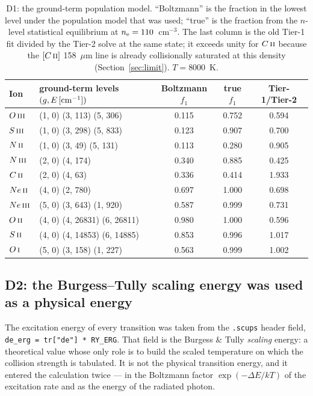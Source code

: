 \documentclass[english,a4paper]{my_memo}
\newcommand{\code}[1]{\texttt{#1}}
\newcommand{\OI}{O\,\textsc{i}}
\newcommand{\OII}{O\,\textsc{ii}}
\newcommand{\OIII}{O\,\textsc{iii}}
\newcommand{\NII}{N\,\textsc{ii}}
\newcommand{\NIII}{N\,\textsc{iii}}
\newcommand{\CII}{C\,\textsc{ii}}
\newcommand{\SII}{S\,\textsc{ii}}
\newcommand{\SIII}{S\,\textsc{iii}}
\newcommand{\NeII}{Ne\,\textsc{ii}}
\newcommand{\NeIII}{Ne\,\textsc{iii}}
\newcommand{\nel}{n_{\rm e}}
\begin{document}
\begin{table}[htbp]
\centering
\caption{D1: the ground-term population model.  ``Boltzmann'' is the fraction
in the lowest level under the population model that was used; ``true'' is the
fraction from the $n$-level statistical equilibrium at $\nel = 110$~cm$^{-3}$.
The last column is the old Tier-1 fit divided by the Tier-2 solve at the same
state; it exceeds unity for $\CII{}$ because the $[\CII{}]$ 158~$\mu$m line is
already collisionally saturated at this density (Section~\ref{sec:limit}).
$T = 8000$~K.}
\label{tab:pops}
\begin{tabular}{llccc}
\toprule
Ion & ground-term levels $(g, E\,[{\rm cm^{-1}}])$ & Boltzmann $f_1$ & true $f_1$ & Tier-1/Tier-2 \\
\midrule
$\OIII{}$  & (1, 0) (3, 113) (5, 306)      & 0.115 & 0.752 & 0.594 \\
$\SIII{}$  & (1, 0) (3, 298) (5, 833)      & 0.123 & 0.907 & 0.700 \\
$\NII{}$   & (1, 0) (3, 49) (5, 131)       & 0.113 & 0.280 & 0.905 \\
$\NIII{}$  & (2, 0) (4, 174)               & 0.340 & 0.885 & 0.425 \\
$\CII{}$   & (2, 0) (4, 63)                & 0.336 & 0.414 & 1.933 \\
$\NeII{}$  & (4, 0) (2, 780)               & 0.697 & 1.000 & 0.698 \\
$\NeIII{}$ & (5, 0) (3, 643) (1, 920)      & 0.587 & 0.999 & 0.731 \\
$\OII{}$   & (4, 0) (4, 26831) (6, 26811)  & 0.980 & 1.000 & 0.596 \\
$\SII{}$   & (4, 0) (4, 14853) (6, 14885)  & 0.853 & 0.996 & 1.017 \\
$\OI{}$    & (5, 0) (3, 158) (1, 227)      & 0.563 & 0.999 & 1.002 \\
\bottomrule
\end{tabular}
\end{table}

\subsection{D2: the Burgess--Tully scaling energy was used as a physical
energy}

The excitation energy of every transition was taken from the \code{.scups}
header field, \code{de\_erg = tr["de"] * RY\_ERG}.  That field is the
Burgess \& Tully \emph{scaling} energy: a theoretical value whose only role is
to build the scaled temperature on which the collision strength is tabulated.
It is not the physical transition energy, and it entered the calculation
twice --- in the Boltzmann factor $\exp(-\Delta E/kT)$ of the excitation rate
and as the energy of the radiated photon.
\end{document}
